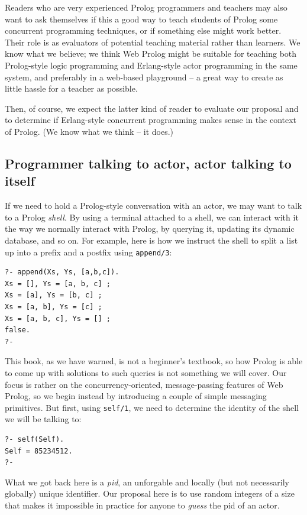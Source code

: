 Readers who are very experienced Prolog programmers and teachers may also want to ask themselves if this a good way to teach students of Prolog some concurrent programming techniques, or if something else might work better. Their role is as evaluators of potential teaching material rather than learners. We know what we believe; we think Web Prolog might be suitable for teaching both Prolog-style logic programming and Erlang-style actor programming in the same system, and preferably in a web-based playground -- a great way to create as little hassle for a teacher as possible.

Then, of course, we expect the latter kind of reader to evaluate our proposal and to determine if Erlang-style concurrent programming makes sense in the context of Prolog. (We know what we think -- it does.)


\subsection{Programmer talking to actor, actor talking to itself}

If we need to hold a Prolog-style conversation with an actor, we may want to talk to a Prolog \textit{shell}. By using a terminal attached to a shell, we can interact with it the way we normally interact with Prolog, by querying it, updating its dynamic database, and so on. For example, here is how we instruct the shell to split a list up into a prefix and a postfix using \texttt{append/3}: 

\begin{verbatim}
?- append(Xs, Ys, [a,b,c]).
Xs = [], Ys = [a, b, c] ;
Xs = [a], Ys = [b, c] ;
Xs = [a, b], Ys = [c] ;
Xs = [a, b, c], Ys = [] ;
false.
?-
\end{verbatim}

\noindent This book, as we have warned, is not a beginner's textbook, so how Prolog is able to come up with solutions to such queries is not something we will cover. Our focus is rather on the concurrency-oriented, message-passing features of Web Prolog, so we begin instead by introducing a couple of simple messaging primitives. But first, using \texttt{self/1}, we need to determine the identity of the shell we will be talking to:

\begin{verbatim}
?- self(Self).
Self = 85234512.
?-        
\end{verbatim}

\noindent What we got back here is a \textit{pid}, an unforgable and locally (but not necessarily globally) unique identifier. Our proposal here is to use random integers of a size that makes it impossible in practice for anyone to \textit{guess} the pid of an actor. %

